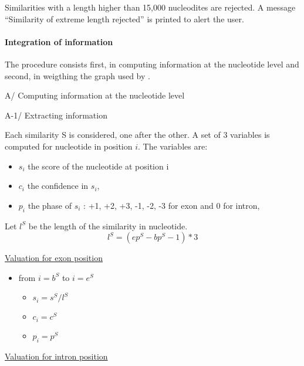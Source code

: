 Similarities with a length higher than 15,000 nucleodites are
rejected. A message ``Similarity of extreme length rejected'' is
printed to alert the user.

\paragraph{Integration of information}

The procedure consists first, in computing information at the
nucleotide level and second, in weigthing the graph used by \EuGene.

A/ Computing information at the nucleotide level

A-1/ Extracting information

Each similarity S is considered, one after the other.  A set of 3
variables is computed for nucleotide in position $i$. The variables
are:
\begin{itemize}
\item $s_i$ the score of the nucleotide at position i
\item $c_i$ the confidence in $s_i$,
\item $p_i$ the phase of $s_i$ : +1, +2, +3, -1, -2, -3 for exon and 0 for intron,
\end{itemize}
Let $l^S$ be the length of the similarity in nucleotide.
\[l^S = (ep^S -bp^S -1)*3\]

\underline{Valuation for exon position} \\

\begin{itemize}
\item from $i = b^S$ to  $i = e^S$
  \begin{itemize}
  \item $s_i = s^S / l^S$
  \item $c_i = c^S$
  \item $p_i = p^S$
  \end{itemize}
\end{itemize}

\underline{Valuation for intron position}\\

